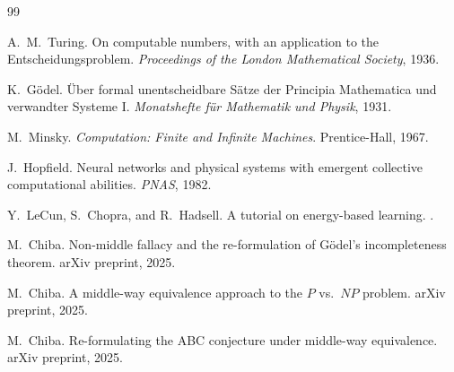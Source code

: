 \documentclass[11pt]{article}
\theoremstyle{definition}
\theoremstyle{remark}
\begin{document}
\begin{thebibliography}{99}

A.~M.~Turing.
\newblock On computable numbers, with an application to the Entscheidungsproblem.
\newblock \emph{Proceedings of the London Mathematical Society}, 1936.

K.~G\"odel.
\newblock \"Uber formal unentscheidbare S\"atze der Principia Mathematica und verwandter Systeme I.
\newblock \emph{Monatshefte f\"ur Mathematik und Physik}, 1931.

M.~Minsky.
\newblock \emph{Computation: Finite and Infinite Machines}.
\newblock Prentice-Hall, 1967.

J.~Hopfield.
\newblock Neural networks and physical systems with emergent collective computational abilities.
\newblock \emph{PNAS}, 1982.

Y.~LeCun, S.~Chopra, and R.~Hadsell.
\newblock A tutorial on energy-based learning.
.

M.~Chiba.
\newblock Non-middle fallacy and the re-formulation of G\"odel's incompleteness theorem.
\newblock arXiv preprint, 2025.

M.~Chiba.
\newblock A middle-way equivalence approach to the $P$ vs.\ $NP$ problem.
\newblock arXiv preprint, 2025.

M.~Chiba.
\newblock Re-formulating the ABC conjecture under middle-way equivalence.
\newblock arXiv preprint, 2025.

\end{thebibliography}
\end{document}
